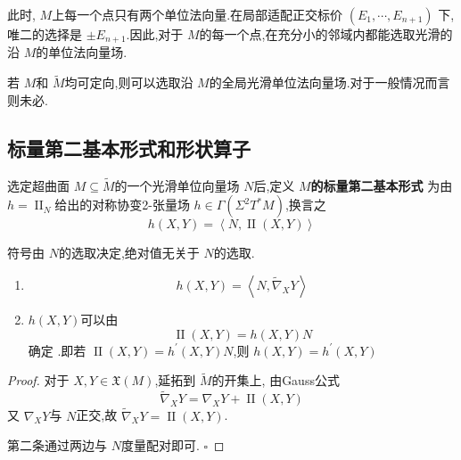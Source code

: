 \documentclass[../../几何与拓扑.tex]{subfiles}
\begin{document}
此时, \(  M  \)上每一个点只有两个单位法向量.在局部适配正交标价 \(\left(    E_1,\cdots,E_{n+ 1}   \right)  \)  下,唯二的选择是 \(  \pm E_{n+ 1}  \).因此,对于 \(  M  \)的每一个点,在充分小的邻域内都能选取光滑的沿 \(  M  \)的单位法向量场.   

若 \(  M  \)和 \(  \tilde{M}  \)均可定向,则可以选取沿 \(  M  \)的全局光滑单位法向量场.对于一般情况而言则未必. 

\subsection{标量第二基本形式和形状算子}

\begin{definition}
    选定超曲面 \(  M\subseteq \tilde{M}  \)的一个光滑单位向量场 \(  N  \)后,定义 \textbf{\(  M  \)的标量第二基本形式 }为由 \(  h= \operatorname{II}_{N}  \)给出的对称协变2-张量场 \(  h\in  \Gamma \left(  \Sigma ^{2}T^{*}M \right)   \),换言之 \[
    h\left( X,Y \right)= \left<N,\operatorname{II}\left( X,Y \right)  \right> 
    \]    
\end{definition}

\begin{remark}
    符号由 \(  N  \)的选取决定,绝对值无关于 \(  N  \)的选取.  
\end{remark}

\begin{proposition}
    \begin{enumerate}
        \item \[
    h\left( X,Y \right)= \left<N, \tilde{\nabla} _{X}Y \right> 
    \]
    \item \(  h\left( X,Y \right)   \)可以由 \[
    \operatorname{II} \left( X,Y \right)= h\left( X,Y \right)N  
    \]确定 .即若 \(  \operatorname{II} \left( X,Y \right)= h^{\prime} \left( X,Y \right)N    \),则 \(  h\left( X,Y \right)= h^{\prime} \left( X,Y \right)    \)  
    \end{enumerate}
    
\end{proposition}

\begin{proof}
    对于 \(  X,Y\in \mathfrak{X}\left( M \right)   \),延拓到 \(  \tilde{M}  \)的开集上,  由Gauss公式 \[
     \tilde{\nabla} _{X}Y=  \nabla _{X}Y+ \operatorname{II}\left( X,Y \right) 
    \]又 \(   \nabla _{X}Y  \)与 \(  N  \)正交,故 \(   \tilde{\nabla} _{X}Y= \operatorname{II}\left( X,Y \right)   \).   


    第二条通过两边与 \(  N  \)度量配对即可. 
    \hfill $\square$
\end{proof}
\end{document}
